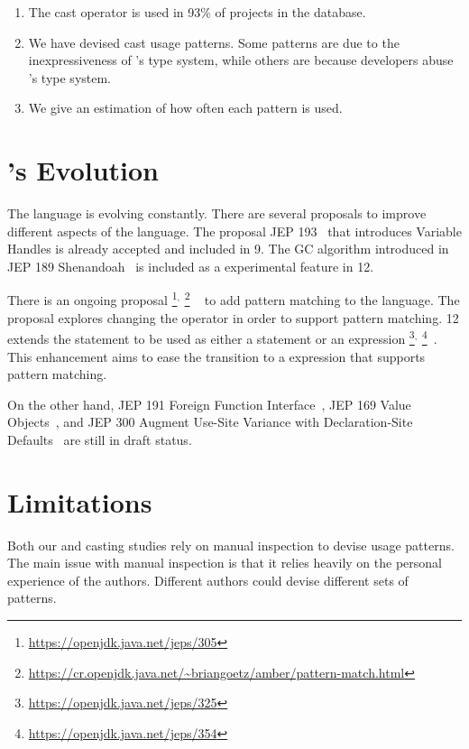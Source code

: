 \begin{enumerate}[label=\ref{casts:rq\arabic*},leftmargin=3.4\parindent]
\item {\bf \crqA} 
The cast operator is used in 93\% of projects in the \lgtm{} database.
\item {\bf \crqB}
We have devised cast usage patterns.
Some patterns are due to the inexpressiveness of \java{}'s type system,
while others are because developers abuse \java{}'s type system.
\item {\bf \crqC} 
We give an estimation of how often each pattern is used.
\end{enumerate}


\section{\java{}'s Evolution}

The \java{} language is evolving constantly.
There are several proposals to improve different aspects of the language.
The proposal JEP 193~\citep{jep193} that introduces Variable Handles is already accepted and included in \java{} 9.
The GC algorithm introduced in JEP 189 Shenandoah~\citep{jep189} is included as a experimental feature in \java{} 12.

There is an ongoing proposal%
\footnote{\url{https://openjdk.java.net/jeps/305}}$^{,}$%
\footnote{\url{https://cr.openjdk.java.net/~briangoetz/amber/pattern-match.html}}%
~\citep{jep305} to add pattern matching to the \java{} language.
The proposal explores changing the  operator in order to support pattern matching.
\java{} 12 extends the  statement to be used as either a statement or an expression%
\footnote{\url{https://openjdk.java.net/jeps/325}}$^{,}$%
\footnote{\url{https://openjdk.java.net/jeps/354}}~\citep{jep325,jep354}.
This enhancement aims to ease the transition to a  expression that supports pattern matching.

On the other hand,
JEP 191 Foreign Function Interface~\citep{jep191},
JEP 169 Value Objects~\citep{jep169}, and
JEP 300 Augment Use-Site Variance with Declaration-Site Defaults~\citep{jep300}
are still in draft status.


\section{Limitations}

Both our \unsafe{} and casting studies rely on manual inspection to devise usage patterns.
The main issue with manual inspection is that it relies heavily on the personal experience of the authors.
Different authors could devise different sets of patterns.

